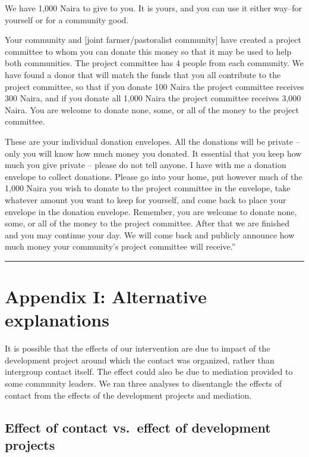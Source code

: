 \documentclass[
]{article}
\begin{document}
We have 1,000 Naira to give to you. It is yours, and you can use it
either way--for yourself or for a community good.

Your community and {[}joint farmer/pastoralist community{]} have created
a project committee to whom you can donate this money so that it may be
used to help both communities. The project committee has 4 people from
each community. We have found a donor that will match the funds that you
all contribute to the project committee, so that if you donate 100 Naira
the project committee receives 300 Naira, and if you donate all 1,000
Naira the project committee receives 3,000 Naira. You are welcome to
donate none, some, or all of the money to the project committee.

These are your individual donation envelopes. All the donations will be
private -- only you will know how much money you donated. It essential
that you keep how much you give private -- please do not tell anyone. I
have with me a donation envelope to collect donations. Please go into
your home, put however much of the 1,000 Naira you wish to donate to the
project committee in the envelope, take whatever amount you want to keep
for yourself, and come back to place your envelope in the donation
envelope. Remember, you are welcome to donate none, some, or all of the
money to the project committee. After that we are finished and you may
continue your day. We will come back and publicly announce how much
money your community's project committee will receive.''

\begin{center}\rule{0.5\linewidth}{0.5pt}\end{center}

\newpage

\hypertarget{appendix-i-alternative-explanations}{%
\section{Appendix I: Alternative
explanations}\label{appendix-i-alternative-explanations}}

It is possible that the effects of our intervention are due to impact of
the development project around which the contact was organized, rather
than intergroup contact itself. The effect could also be due to
mediation provided to some community leaders. We ran three analyses to
disentangle the effects of contact from the effects of the development
projects and mediation.

\hypertarget{effect-of-contact-vs.-effect-of-development-projects}{%
\subsection{Effect of contact vs.~effect of development
projects}\label{effect-of-contact-vs.-effect-of-development-projects}}
\end{document}
